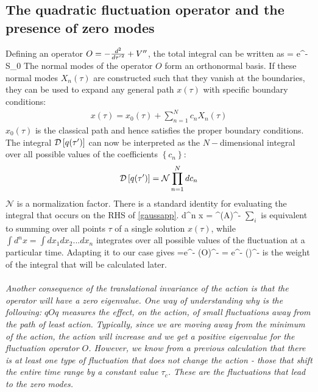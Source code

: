 \documentclass[12pt]{article}
\begin{document}
\subsection*{The quadratic fluctuation operator and the presence of zero modes}
Defining an operator \(O = -\frac{d^2}{d{\tau^\prime}^2} + V^{\prime\prime}\), the total integral can be written as
\beq[gaussapp]
\int {} = e^{-S_0} \int {}
\eeq
The normal modes of the operator \(O\) form an orthonormal basis. If these normal modes \(X_n(\tau)\) are constructed such that they vanish at the boundaries, they can be used to expand any general path \(x(\tau)\) with specific boundary conditions:
\begin{equation}\begin{aligned}
	x(\tau) = x_0(\tau) + \sum_{n=1}^N c_n X_n(\tau)
\end{aligned}\end{equation}
\(x_0(\tau)\) is the classical path and hence satisfies the proper boundary conditions. The integral \(\mathcal{D}\left[{q(\tau^\prime)}\right]\) can now be interpreted as the \(N-\)dimensional integral over all possible values of the coefficients \(\left\{ c_n \right\} \):
\begin{equation}\begin{aligned}
	\mathcal{D}\left[{q(\tau^\prime)}\right] = \mathcal{N}\prod_{n=1}^N dc_n
\end{aligned}\end{equation}
\(\mathcal{N}\) is a normalization factor. There is a standard identity for evaluating the integral that occurs on the RHS of  \ref{gaussapp}.
\beq
\int d^n x  = \rr{2\pi}^\left(\;A\right)^{-}
\eeq
\(\sum_i\) is equivalent to summing over all points \(\tau\) of a single solution \(x(\tau)\), while \(\int d^n x = \int d x_1 d x_2 ... dx_n\) integrates over all possible values of the fluctuation at a particular time.
Adapting it to our case gives
\beq
\int {} =e^{-}  \left(\;O\right)^{-} = e^{-}  \left(\right)^{- }
\eeq
{} is the weight of the integral that will be calculated later. 
\\\\
\textit{Another consequence of the translational invariance of the action is that the operator  will have a zero eigenvalue. One way of understanding why is the following: \(qOq\) measures the effect, on the action, of small fluctuations away from the path of least action. Typically, since we are moving away from the minimum of the action, the action will increase and we get a positive eigenvalue for the fluctuation operator \(O\). However, we know from a previous calculation that there is at least one type of fluctuation that does not change the action - those that shift the entire time range by a constant value \(\tau_c\). These are the fluctuations that lead to the zero modes.}\\\\
\end{document}
